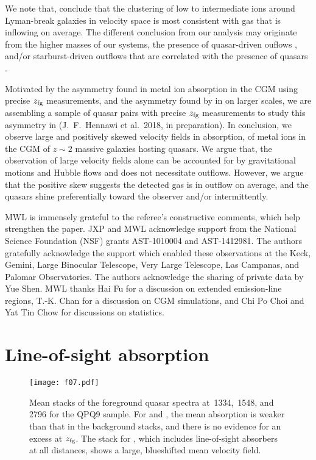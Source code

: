 \documentclass[iop]{emulateapj}
\begin{document}
We note that, \cite{Turner+17} conclude that the clustering of low to intermediate ions around
Lyman-break galaxies in velocity space is
most consistent with gas that is inflowing on average. The different conclusion from our analysis
may originate from the higher masses of our systems, the presence of quasar-driven ouflows
\citep[e.g.,][]{Greene+12}, and/or starburst-driven outflows that are correlated with the presence
of quasars \citep[e.g.,][]{Barthel+17}.

Motivated by the asymmetry found in metal ion absorption in the CGM using precise $z_{\rm fg}$
measurements, and the asymmetry found by \cite{KirkmanTytler08} in  on larger
scales, we are assembling a sample of quasar pairs with precise $z_{\rm fg}$ measurements to study
this asymmetry in  (J.\ F.\ Hennawi et al.\ 2018, in preparation). In conclusion, we
observe large and positively skewed velocity fields in absorption, of metal ions
in the CGM of $z\sim2$ massive galaxies hosting quasars.
We argue that, the observation of large velocity fields alone can be accounted for by
gravitational motions and Hubble flows and does not necessitate outflows. However, we argue that the
positive skew suggests the detected gas is in outflow on average, and the quasars shine
preferentially toward the observer and/or intermittently.

\acknowledgements
MWL is immensely grateful to the referee's constructive comments, which help strengthen the
paper.
JXP and MWL acknowledge support from the National Science Foundation (NSF) grants AST-1010004 and
AST-1412981. The authors gratefully acknowledge the support which enabled these observations at
the Keck, Gemini, Large Binocular Telescope, Very Large Telescope, Las Campanas, and Palomar
Observatories. The authors acknowledge the sharing of private data by Yue Shen. MWL thanks Hai Fu
for a discussion on extended emission-line regions, T.-K. Chan for a discussion on CGM
simulations, and Chi Po Choi and Yat Tin Chow for discussions on statistics.

\appendix

\section{Line-of-sight absorption}
\label{sec:appendix}

\begin{figure}
\texttt{[image: f07.pdf]}
\caption{Mean stacks of the foreground quasar spectra at \,1334, \,1548, and
\,2796 for the QPQ9 sample. For  and , the mean absorption is
weaker than that in the background stacks, and there is no evidence for an excess at $z_{\rm fg}$.
The stack for , which includes line-of-sight absorbers at all distances, shows a large,
blueshifted mean velocity field.
}
\label{fig:stacks_fg}
\end{figure}
\end{document}
